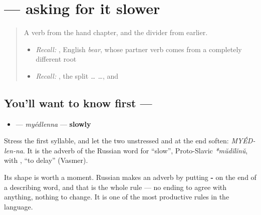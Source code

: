 \section[\texorpdfstring{\ru{медленно} (myédlenna)}{медленно (myédlenna)}]{ — asking for it slower}

\label{lesson:RU-C21-medlenno}



\begin{quote}
A verb from the hand chapter, and the divider from earlier.

\begin{itemize}
\raggedright
  \item \emph{Recall:} \emph{}, English \emph{bear}, whose partner verb comes from a completely different root
  \item \emph{Recall:} \emph{}, the split \emph{ …  …}, and \emph{}
\end{itemize}
\end{quote}

\subsection*{You'll want to know first — }
\begin{itemize}
\raggedright
  \item \textbf{} — \emph{myédlenna} — \textbf{slowly}
\end{itemize}

Stress the first syllable, and let the two unstressed \textbf{} and \textbf{} at the end soften: \emph{MYÉD-len-na}. It is the adverb of the Russian word for \textquotedblleft{}slow\textquotedblright{}, Proto-Slavic \emph{*mŭdĭlĭnŭ}, with \emph{}, \textquotedblleft{}to delay\textquotedblright{} (Vasmer).

Its shape is worth a moment. Russian makes an adverb by putting \textbf{-} on the end of a describing word, and that is the whole rule — no ending to agree with anything, nothing to change. It is one of the most productive rules in the language.

